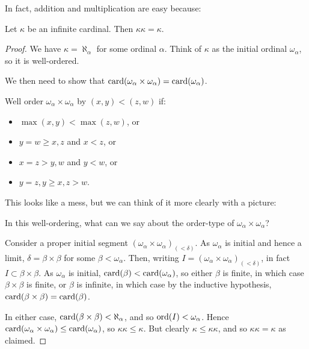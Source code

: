 \documentclass[10pt,a4paper]{article}
\begin{document}
In fact, addition and multiplication are easy because:
\begin{proposition}
Let $\kappa$ be an infinite cardinal. Then $\kappa\kappa =\kappa$.
\end{proposition}
\begin{proof}
We have $\kappa = \aleph_\alpha$ for some ordinal $\alpha$. Think of $\kappa$ as the initial ordinal $\omega_\alpha$, so it is well-ordered.

We then need to show that $\operatorname{card}(\omega_\alpha \times \omega_\alpha) = \operatorname{card}(\omega_\alpha)$.

Well order $\omega_\alpha \times \omega_\alpha$ by $(x,y) < (z,w)$ if:
\begin{itemize}
\item $\max(x,y) < \max(z,w)$, or
\item $y = w \geq x,z$ and $ x < z$, or
\item $x = z > y,w$ and $y < w$, or
\item $y = z, y \geq x, z > w$.
\end{itemize}
This looks like a mess, but we can think of it more clearly with a picture:
\begin{figure}[H]
\centering
{}
\end{figure}
In this well-ordering, what can we say about the order-type of $\omega_\alpha\times\omega_\alpha$?

Consider a proper initial segment $(\omega_\alpha \times \omega_\alpha)_{(<\delta)}$. As $\omega_\alpha$ is initial and hence a limit, $\delta = \beta \times \beta$ for some $\beta < \omega_\alpha$. Then, writing $I = (\omega_\alpha \times \omega_\alpha)_{(<\delta)}$, in fact $I \subset \beta \times \beta$. As $\omega_\alpha$ is initial, $\operatorname{card}(\beta) < \operatorname{card}(\omega_\alpha)$, so either $\beta$ is finite, in which case $\beta \times \beta$ is finite, or $\beta$ is infinite, in which case by the inductive hypothesis, $\operatorname{card}(\beta \times \beta) = \operatorname{card}(\beta)$.

In either case, $\operatorname{card}(\beta \times \beta) < \aleph_\alpha$, and so $\operatorname{ord}(I) < \omega_\alpha$. Hence $\operatorname{card}(\omega_\alpha\times\omega_\alpha) \leq \operatorname{card}(\omega_\alpha)$, so $\kappa\kappa \leq\kappa$. But clearly $\kappa \leq \kappa\kappa$, and so $\kappa\kappa = \kappa$ as claimed.
\end{proof}
\end{document}
